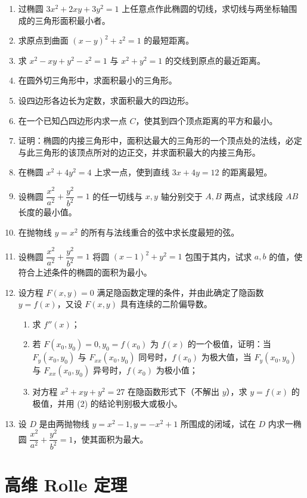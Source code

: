 \begin{xexercise}
\begin{enumerate}[label=\arabic*.,start=16]
  \item 过椭圆 $3x^2+2xy+3y^2=1$ 上任意点作此椭圆的切线，求切线与两坐标轴围成的三角形面积最小者。
  \item 求原点到曲面 $(x-y)^2+z^2=1$ 的最短距离。
  \item 求 $x^2-xy+y^2-z^2=1$ 与 $x^2+y^2=1$ 的交线到原点的最近距离。
  \item 在圆外切三角形中，求面积最小的三角形。
  \item 设四边形各边长为定数，求面积最大的四边形。
  \item 在一个已知凸四边形内求一点 $C$，使其到四个顶点距离的平方和最小。
  \item 证明：椭圆的内接三角形中，面积达最大的三角形的一个顶点处的法线，必定与此三角形的该顶点所对的边正交，并求面积最大的内接三角形。
  \item 在椭圆 $x^2+4y^2=4$ 上求一点，使到直线 $3x+4y=12$ 的距离最短。
  \item 设椭圆 $\dfrac{x^2}{a^2}+\dfrac{y^2}{b^2}=1$ 的任一切线与 $x,y$ 轴分别交于 $A,B$ 两点，试求线段 $AB$ 长度的最小值。
  \item 在抛物线 $y=x^2$ 的所有与法线重合的弦中求长度最短的弦。
  \item 设椭圆 $\dfrac{x^2}{a^2}+\dfrac{y^2}{b^2}=1$ 将圆 $(x-1)^2+y^2=1$ 包围于其内，试求 $a,b$ 的值，使符合上述条件的椭圆的面积为最小。
  \item 设方程 $F(x,y)=0$ 满足隐函数定理的条件，并由此确定了隐函数 $y=f(x)$，又设 $F(x,y)$ 具有连续的二阶偏导数。
  \begin{enumerate}[label=(\arabic*)]
    \item 求 $f''(x)$；
    \item 若 $F(x_0,y_0)=0,y_0=f(x_0)$ 为 $f(x)$ 的一个极值，证明：当 $F_y(x_0,y_0)$ 与 $F_{xx}(x_0,y_0)$ 同号时，$f(x_0)$ 为极大值，当 $F_y(x_0,y_0)$ 与 $F_{xx}(x_0,y_0)$ 异号时，$f(x_0)$ 为极小值；
    \item 对方程 $x^2+xy+y^2=27$ 在隐函数形式下（不解出 $y$），求 $y=f(x)$ 的极值，并用 (2) 的结论判别极大或极小。
  \end{enumerate}
  \item 设 $D$ 是由两抛物线 $y=x^2-1,y=-x^2+1$ 所围成的闭域，试在 $D$ 内求一椭圆 $\dfrac{x^2}{a^2}+\dfrac{y^2}{b^2}=1$，使其面积为最大。
\end{enumerate}
\end{xexercise}

\section{高维 Rolle 定理}

